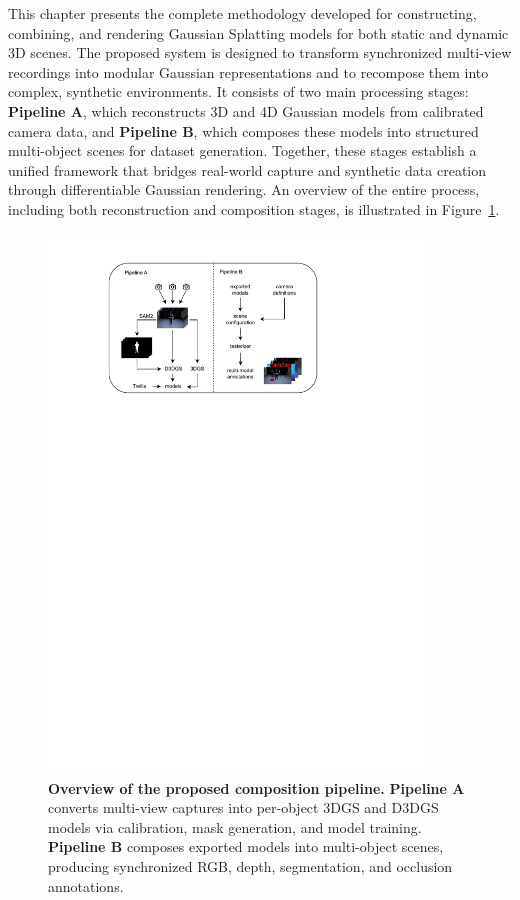 This chapter presents the complete methodology developed for constructing, combining, and rendering Gaussian Splatting models for both static and dynamic 3D scenes. 
The proposed system is designed to transform synchronized multi-view recordings into modular Gaussian representations and to recompose them into complex, synthetic environments. 
It consists of two main processing stages: \textbf{Pipeline A}, which reconstructs 3D and 4D Gaussian models from calibrated camera data, and \textbf{Pipeline B}, which composes these models into structured multi-object scenes for dataset generation. 
Together, these stages establish a unified framework that bridges real-world capture and synthetic data creation through differentiable Gaussian rendering. 
An overview of the entire process, including both reconstruction and composition stages, is illustrated in Figure~\ref{fig:Ablauf}.

\begin{figure}[!t]
    \centering
    \includegraphics[width=0.9\textwidth]{Grafiken/Ablauf.pdf}
    \caption{
       \textbf{Overview of the proposed composition pipeline.}
        \textbf{Pipeline A} converts multi-view captures into per-object 3DGS and D3DGS models via calibration, mask generation, and model training.
        \textbf{Pipeline B} composes exported models into multi-object scenes, producing synchronized RGB, depth, segmentation, and occlusion annotations.
    }
    \label{fig:Ablauf}
\end{figure}


